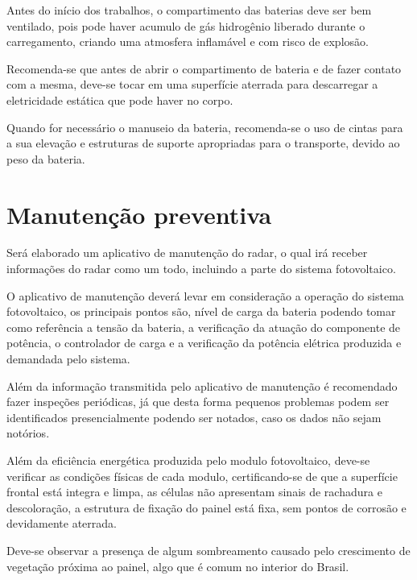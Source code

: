 Antes do início dos trabalhos, o compartimento das baterias deve ser bem ventilado, pois pode haver acumulo de gás hidrogênio liberado durante o carregamento, criando uma atmosfera inflamável e com risco de explosão. 

Recomenda-se que antes de abrir o compartimento de bateria e de fazer contato com a mesma, deve-se tocar em uma superfície aterrada para descarregar a eletricidade estática que pode haver no corpo.

Quando for necessário o manuseio da bateria, recomenda-se o uso de cintas para a sua elevação e estruturas de suporte apropriadas para o transporte, devido ao peso da bateria. 


\section{Manutenção preventiva}

Será elaborado um aplicativo de manutenção do radar, o qual irá receber informações do radar como um todo, incluindo a parte do sistema fotovoltaico.

O aplicativo de manutenção deverá levar em consideração a operação do sistema fotovoltaico, os principais pontos são, nível de carga da bateria podendo tomar como referência a tensão da bateria, a verificação da atuação do componente de potência, o controlador de carga e a verificação da potência elétrica produzida e demandada pelo sistema.

Além da informação transmitida pelo aplicativo de manutenção é recomendado fazer inspeções periódicas, já que desta forma pequenos problemas podem ser identificados presencialmente podendo ser notados, caso os dados não sejam notórios.

Além da eficiência energética produzida pelo modulo fotovoltaico, deve-se verificar as condições físicas de cada modulo, certificando-se de que a superfície frontal está integra e limpa, as células não apresentam sinais de rachadura e descoloração, a estrutura de fixação do painel está fixa, sem pontos de corrosão e devidamente aterrada.

Deve-se observar a presença de algum sombreamento causado pelo crescimento de vegetação próxima ao painel, algo que é comum no interior do Brasil.

